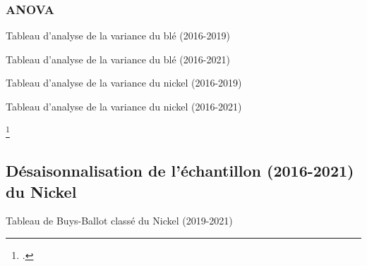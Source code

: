 \documentclass[12pt,a4paper]{article}
\begin{document}
\subsubsection{ANOVA}\label{appendix:anova}
\begin{table}[H]
    \centering
    \caption{Tableau d'analyse de la variance du blé (2016-2019) }
    \label{tab:anova_ble19}
    \sffamily
    
\end{table}
\begin{table}[H]
    \centering
    \caption{Tableau d'analyse de la variance du blé (2016-2021) }
    \label{tab:anova_ble21}
    \sffamily
    
\end{table}
\begin{table}[H]
    \centering
    \caption{Tableau d'analyse de la variance du nickel (2016-2019) }
    \label{tab:anova_nickel19}
    \sffamily
    
\end{table}
\begin{table}[H]
    \centering
    \caption{Tableau d'analyse de la variance du nickel (2016-2021) }
    \label{tab:anova_nickel21}
    \sffamily
    
\end{table}
\begin{table}[htpb]
    \centering
    \caption[test]{Analyse de la variance\footnotemark }
    \label{tab:anova}
\end{table}
\footcitetext{terraza}

\subsection{Désaisonnalisation de l'échantillon (2016-2021) du Nickel}
\begin{table}[H]
    \centering
    \caption{Tableau de Buys-Ballot classé du Nickel (2019-2021)}
    \label{tab:bbc}
    \sffamily
    \resizebox{\textwidth}{!}{}
\end{table}
\end{document}
